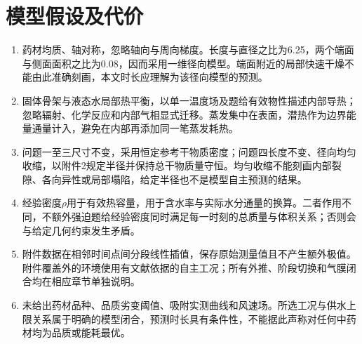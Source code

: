 \section{模型假设及代价}
\begin{enumerate}
\item 药材均质、轴对称，忽略轴向与周向梯度。长度与直径之比为6.25，两个端面与侧面面积之比为0.08，因而采用一维径向模型。端面附近的局部快速干燥不能由此准确刻画，本文时长应理解为该径向模型的预测。
\item 固体骨架与液态水局部热平衡，以单一温度场及题给有效物性描述内部导热；忽略辐射、化学反应和内部气相显式迁移。蒸发集中在表面，潜热作为边界能量通量计入，避免在内部再添加同一笔蒸发耗热。
\item 问题一至三尺寸不变，采用恒定参考干物质密度；问题四长度不变、径向均匀收缩，以附件2规定半径并保持总干物质量守恒。均匀收缩不能刻画内部裂隙、各向异性或局部塌陷，给定半径也不是模型自主预测的结果。
\item 经验密度$\rho$用于有效热容量，\rhod{}用于含水率与实际水分通量的换算。二者作用不同，不额外强迫题给经验密度同时满足每一时刻的总质量与体积关系；否则会与给定几何约束发生矛盾。
\item 附件数据在相邻时间点间分段线性插值，保存原始测量值且不产生额外极值。附件覆盖外的环境使用有文献依据的自主工况；所有外推、阶段切换和气膜闭合均在相应章节单独说明。
\item 未给出药材品种、品质劣变阈值、吸附实测曲线和风速场。所选工况与供水上限关系属于明确的模型闭合，预测时长具有条件性，不能据此声称对任何中药材均为品质或能耗最优。
\end{enumerate}
